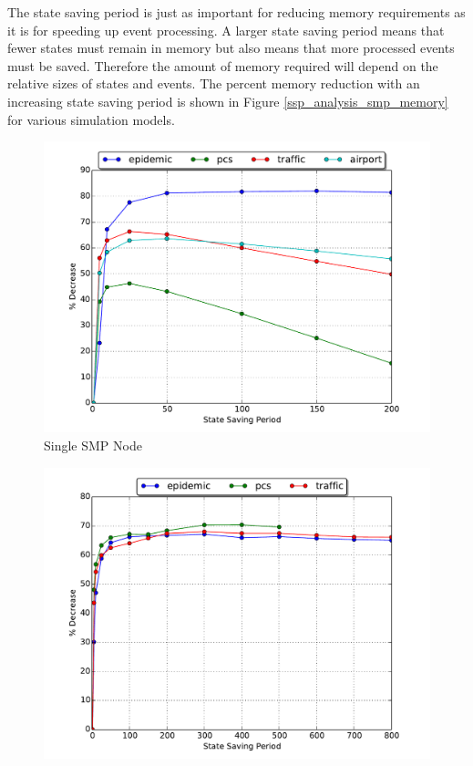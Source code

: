 \documentclass[11pt]{book}
\begin{document}
The state saving period is just as important for reducing memory requirements as it is for speeding
up event processing.  A larger state saving period means that fewer states must remain in memory but
also means that more processed events must be saved.  Therefore the amount of memory required will
depend on the relative sizes of states and events.  The percent memory reduction with an increasing
state saving period is shown in Figure \ref{ssp_analysis_smp_memory} for various simulation models.

\begin{figure}
  \begin{minipage}{.5\textwidth}
    \begin{center}
      \includegraphics[width=\textwidth,keepaspectratio,quiet]{figs/state_saving/bc/percent_memory_decrease.pdf} \\
      Single SMP Node \\
    \end{center}
  \end{minipage}%
  \hfill
  \begin{minipage}{.5\textwidth}
    \begin{center}
      \includegraphics[width=\textwidth,keepaspectratio,quiet]{figs/state_saving/beowulf/percent_memory_decrease.pdf} \\

\end{center}
\end{minipage}
\end{figure}
\end{document}

